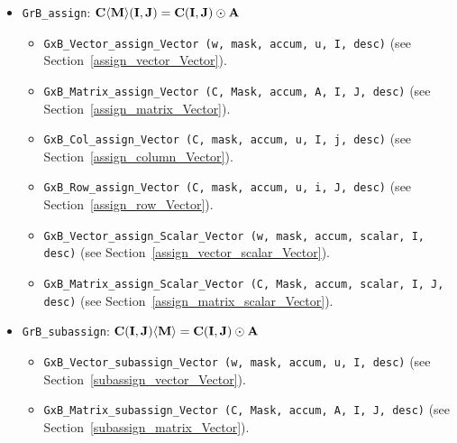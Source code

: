\begin{itemize}
\item \verb'GrB_assign': ${\bf C \langle M \rangle (I,J) = C(I,J) \odot A}$

    \begin{itemize}

    \item \verb'GxB_Vector_assign_Vector (w, mask, accum, u, I, desc)' \newline
    (see Section~\ref{assign_vector_Vector}).

    \item \verb'GxB_Matrix_assign_Vector (C, Mask, accum, A, I, J, desc)' \newline
    (see Section~\ref{assign_matrix_Vector}).

    \item \verb'GxB_Col_assign_Vector (C, mask, accum, u, I, j, desc)' \newline
    (see Section~\ref{assign_column_Vector}).

    \item \verb'GxB_Row_assign_Vector (C, mask, accum, u, i, J, desc)' \newline
    (see Section~\ref{assign_row_Vector}).

    \item \verb'GxB_Vector_assign_Scalar_Vector (w, mask, accum, scalar, I, desc)' \newline
    (see Section~\ref{assign_vector_scalar_Vector}).

    \item \verb'GxB_Matrix_assign_Scalar_Vector (C, Mask, accum, scalar, I, J, desc)' \newline
    (see Section~\ref{assign_matrix_scalar_Vector}).

    \end{itemize}

\item \verb'GrB_subassign': ${\bf C (I,J) \langle M \rangle = C(I,J) \odot A}$

    \begin{itemize}
    \item \verb'GxB_Vector_subassign_Vector (w, mask, accum, u, I, desc)' \newline
    (see Section~\ref{subassign_vector_Vector}).

    \item \verb'GxB_Matrix_subassign_Vector (C, Mask, accum, A, I, J, desc)' \newline
    (see Section~\ref{subassign_matrix_Vector}).


\end{itemize}
\end{itemize}

